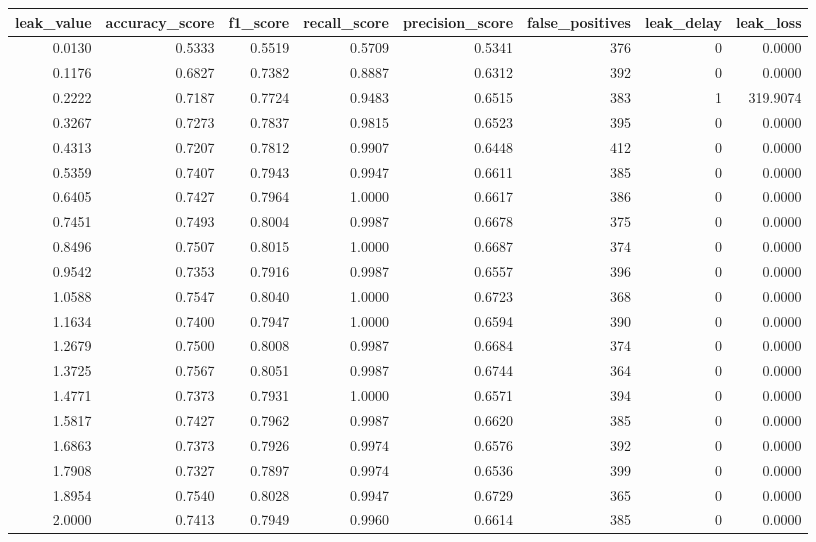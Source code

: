 \begin{tabular}{rrrrrrrr}
\toprule
leak\_value & accuracy\_score & f1\_score & recall\_score & precision\_score & false\_positives & leak\_delay & leak\_loss \\
\midrule
0.0130 & 0.5333 & 0.5519 & 0.5709 & 0.5341 & 376 & 0 & 0.0000 \\
0.1176 & 0.6827 & 0.7382 & 0.8887 & 0.6312 & 392 & 0 & 0.0000 \\
0.2222 & 0.7187 & 0.7724 & 0.9483 & 0.6515 & 383 & 1 & 319.9074 \\
0.3267 & 0.7273 & 0.7837 & 0.9815 & 0.6523 & 395 & 0 & 0.0000 \\
0.4313 & 0.7207 & 0.7812 & 0.9907 & 0.6448 & 412 & 0 & 0.0000 \\
0.5359 & 0.7407 & 0.7943 & 0.9947 & 0.6611 & 385 & 0 & 0.0000 \\
0.6405 & 0.7427 & 0.7964 & 1.0000 & 0.6617 & 386 & 0 & 0.0000 \\
0.7451 & 0.7493 & 0.8004 & 0.9987 & 0.6678 & 375 & 0 & 0.0000 \\
0.8496 & 0.7507 & 0.8015 & 1.0000 & 0.6687 & 374 & 0 & 0.0000 \\
0.9542 & 0.7353 & 0.7916 & 0.9987 & 0.6557 & 396 & 0 & 0.0000 \\
1.0588 & 0.7547 & 0.8040 & 1.0000 & 0.6723 & 368 & 0 & 0.0000 \\
1.1634 & 0.7400 & 0.7947 & 1.0000 & 0.6594 & 390 & 0 & 0.0000 \\
1.2679 & 0.7500 & 0.8008 & 0.9987 & 0.6684 & 374 & 0 & 0.0000 \\
1.3725 & 0.7567 & 0.8051 & 0.9987 & 0.6744 & 364 & 0 & 0.0000 \\
1.4771 & 0.7373 & 0.7931 & 1.0000 & 0.6571 & 394 & 0 & 0.0000 \\
1.5817 & 0.7427 & 0.7962 & 0.9987 & 0.6620 & 385 & 0 & 0.0000 \\
1.6863 & 0.7373 & 0.7926 & 0.9974 & 0.6576 & 392 & 0 & 0.0000 \\
1.7908 & 0.7327 & 0.7897 & 0.9974 & 0.6536 & 399 & 0 & 0.0000 \\
1.8954 & 0.7540 & 0.8028 & 0.9947 & 0.6729 & 365 & 0 & 0.0000 \\
2.0000 & 0.7413 & 0.7949 & 0.9960 & 0.6614 & 385 & 0 & 0.0000 \\
\bottomrule
\end{tabular}
